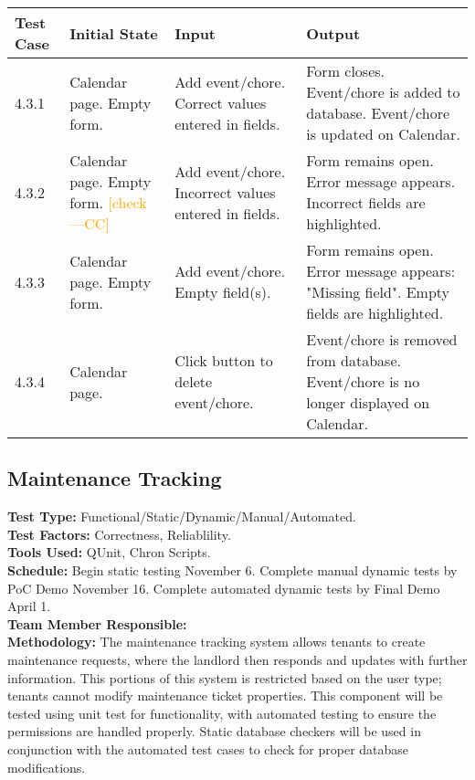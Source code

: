 \documentclass[12pt]{article}
\newcommand{\authornote}[3]{\textcolor{#1}{[#3 ---#2]}}
\newcommand{\authornote}[3]{}
\newcommand{\cc}[1]{\authornote{orange}{CC}{#1}}
\begin{document}
\begin{longtable}{|p{2cm}|p{3cm}|p{5cm}|p{5cm}|}
\hline
\textbf{Test Case}  & \textbf{Initial State} & \textbf{Input} & \textbf{Output} \\ \hline
4.3.1 & Calendar page. Empty form. & Add event/chore. Correct values entered in fields. & Form closes. Event/chore is added to database. Event/chore is updated on Calendar. \\ 
\hline
4.3.2 & Calendar page. Empty form. \cc{check} & Add event/chore. Incorrect values entered in fields. & Form remains open. Error message appears. Incorrect fields are highlighted. \\
\hline
4.3.3 & Calendar page. Empty form. & Add event/chore. Empty field(s). & Form remains open. Error message appears: "Missing field". Empty fields are highlighted. \\
\hline
4.3.4 & Calendar page. & Click button to delete event/chore.  & Event/chore is removed from database. Event/chore is no longer displayed on Calendar. \\
\hline
\end{longtable}

\subsection{Maintenance Tracking}
\textbf{Test Type:} Functional/Static/Dynamic/Manual/Automated. \\
\textbf{Test Factors:} Correctness, Reliablility. \\
\textbf{Tools Used:} QUnit, Chron Scripts. \\
\textbf{Schedule:} Begin static testing November 6. Complete manual dynamic tests by PoC Demo November 16. Complete automated dynamic tests by Final Demo April 1. \\
\textbf{Team Member Responsible:} \\
\textbf{Methodology:} The maintenance tracking system allows tenants to create maintenance requests, where the landlord then responds and updates with further information. This portions of this system is restricted based on the user type; tenants cannot modify maintenance ticket properties. This component will be tested using unit test for functionality, with automated testing to ensure the permissions are handled properly. Static database checkers will be used in conjunction with the automated test cases to check for proper database modifications.
\end{document}
